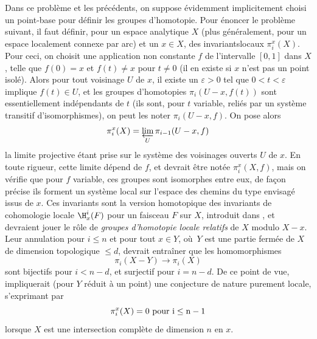 \enlargethispage{\baselineskip}%
Dans ce probl\`eme et les pr\'ec\'edents, on suppose \'evidemment implicitement choisi un point-base pour d\'efinir les groupes d'homotopie. Pour \'enoncer le probl\`eme suivant, il faut d\'efinir, pour un espace analytique $X$ (plus g\'en\'eralement, pour un espace localement connexe par arc) et un $x\in X$, des invariants\pageoriginale locaux $\pi_i^x(X)$.\label{pagexpo} Pour ceci, on choisit une application non constante $f$ de l'intervalle $[0, 1]$ dans $X$, telle que $f(0)=x$ et $f(t)\neq x$ pour $t\neq 0$ (il en existe si $x$ n'est pas un point isol\'e). Alors pour tout voisinage $U$ de $x$, il existe un $\varepsilon>0$ tel que $0<t<\varepsilon$ implique $f(t)\in U$, et les groupes d'homotopies $\pi_i(U-x, f(t))$ sont essentiellement ind\'ependants de $t$ (ils sont, pour $t$ variable, reli\'es par un syst\`eme transitif d'isomorphismes), on peut les noter $\pi_i(U-x, f)$. On pose alors\label{pip15}\label{pXIII.15}
$$
\pi_i^x(X)= \varprojlim_{U}\pi_{i-1}(U-x, f)
$$
la limite projective \'etant prise sur le syst\`eme des voisinages ouverts $U$ de $x$. En toute rigueur, cette limite d\'epend de $f$, et devrait \^etre not\'ee $\pi_i^x(X, f)$, mais on v\'erifie que pour $f$ variable, ces groupes sont isomorphes entre eux, de fa\c con pr\'ecise ils forment un syst\`eme local sur l'espace des chemins du type envisag\'e issus de $x$. Ces invariants sont la version homotopique des invariants de cohomologie locale $\H^i_x(F)$ pour un faisceau $F$ sur $X$, introduit dans , et devraient jouer le r\^{o}le de \emph{groupes d'homotopie locale relatifs} de $X$ modulo $X-x$. Leur annulation pour $i\le n$ et pour tout $x\in Y$, o\`u~$Y$ est une partie ferm\'ee de $X$ de dimension topologique $\le d$, devrait entra\^iner que les homomorphismes
$$
\pi_i(X-Y) \to \pi_i(X)
$$
sont bijectifs pour $i<n-d$, et surjectif pour $i=n-d$. De ce point de vue,  impliquerait (pour $Y$ r\'eduit \`a un point) une conjecture de nature purement locale, s'exprimant par 
$$
\pi_i^x(X)=0 \rm{\ pour\ } i\le n-1\label{p15l}
$$
lorsque $X$ est une intersection compl\`ete de dimension $n$ en $x$.

